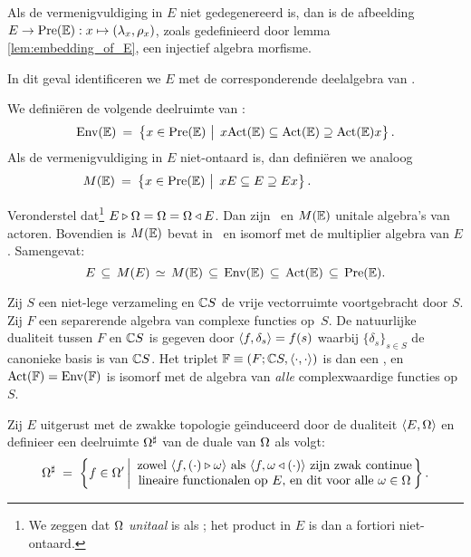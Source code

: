 \documentclass{book}
\begin{document}
\begin{lemma}
Als de vermenigvuldiging in\/ $E$ niet gedegenereerd is, dan is de afbeelding\/
$E \rightarrow \mbox{\rm Pre}(\mathbb{E}): x \mapsto (\lambda_x,\rho_x)$, zoals gedefinieerd door
lemma \ref{lem:embedding_of_E}, een injectief algebra morfisme.
\end{lemma}

In dit geval identificeren we $E$ met de corresponderende deelalgebra van \PreE\@.

\begin{defn} \rm
We defini\"eren de volgende deelruimte van \PreE:
$$ \EnvE  \:=\:  \left\{x\in\PreE  \,\left|\vertM\right.\,
                       x \ActE \subseteq \ActE \supseteq \ActE x \right\}. $$
Als de vermenigvuldiging in $E$ niet-ontaard is, dan defini\"eren we analoog
$$ M(\EE) \:=\:  \left\{x\in\PreE  \,\left|\vertM\right.\,
                       x E  \subseteq E  \supseteq E x \right\}. \hspace{6em} $$
\end{defn}


\begin{lemma} \label{lem:algebras_van_actoren}
Veronderstel dat\footnote{We zeggen dat $\Omega$ {\em unitaal\/} is als \Ebimod;
het product in $E$ is dan a fortiori niet-ontaard.}
$E \triangleright \Omega = \Omega = \Omega \triangleleft E$.
Dan zijn\/ \EnvE\ en\/ $M(\mathbb{E})$ unitale algebra's van actoren.
Bovendien is\/ $M(\mathbb{E})$ bevat in\/ \EnvE\ en isomorf met de multiplier algebra van $E$.
Samengevat:
$$ E \,\subseteq\, M(E)  \,\simeq\,    M(\mathbb{E}) \,\subseteq\, \mbox{\rm Env}(\mathbb{E})
     \,\subseteq\, \mbox{\rm Act}(\mathbb{E}) \,\subseteq\, \mbox{\rm Pre}(\mathbb{E}). $$
\end{lemma}


\begin{ex} \rm
Zij $S$ een niet-lege verzameling en $\mathbb{C} S$ de vrije vectorruimte
voortgebracht door $S$. Zij $F$ een separerende algebra van complexe functies
\mbox{op $S$}\@.
De natuurlijke dualiteit tussen $F$ en $\mathbb{C} S$
is gegeven door $\langle f,\delta_s \rangle = f(s)$ waarbij $\{\delta_s\}_{s\in S}$
de canonieke basis is van $\mathbb{C} S$.
Het triplet $\mathbb{F}\equiv(F; \mathbb{C} S, \langle\cdot, \cdot\rangle)$ is dan een \context,
en ${\rm Act}(\mathbb{F}) = {\rm Env}(\mathbb{F})$ is isomorf met de algebra van {\em alle\/}
complexwaardige functies op $S$.
\end{ex}


\begin{defn} \rm
Zij $E$ uitgerust met de zwakke topologie ge\"{\i}nduceerd door de
dualiteit $\langle E,\Omega \rangle$ en definieer een deelruimte $\Omega^\sharp$ van de
duale van $\Omega$ als volgt:
$$ \Omega^\sharp \;=\;
     \left \{ f \in \Omega' \left|
          \begin{array}{c}
            \mbox{zowel $\langle f,(\cdot) \triangleright \omega \rangle$
                  als $\langle f,\omega \triangleleft (\cdot) \rangle$ zijn zwak continue}   \\
            \mbox{lineaire functionalen op $E$, en dit voor alle $\omega\in \Omega$}
          \end{array} \right. \!\!\! \right\}.     $$
\end{defn}
\end{document}
